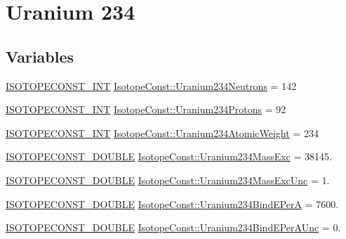\hypertarget{group___isotope_const-_uranium-_u234}{}\section{Uranium 234}
\label{group___isotope_const-_uranium-_u234}
\subsection*{Variables}
\begin{DoxyCompactItemize}
\item 
\mbox{\hyperlink{group___isotope_const-_macros_ga5f18360b3e99483a35c32d789e62621c}{I\+S\+O\+T\+O\+P\+E\+C\+O\+N\+S\+T\+\_\+\+I\+NT}} \mbox{\hyperlink{group___isotope_const-_uranium-_u234_gae9ac5126c38318056cb9f3781b5bd636}{Isotope\+Const\+::\+Uranium234\+Neutrons}} = 142
\item 
\mbox{\hyperlink{group___isotope_const-_macros_ga5f18360b3e99483a35c32d789e62621c}{I\+S\+O\+T\+O\+P\+E\+C\+O\+N\+S\+T\+\_\+\+I\+NT}} \mbox{\hyperlink{group___isotope_const-_uranium-_u234_gae6423ec7f68b44fc9706e3285d26dbec}{Isotope\+Const\+::\+Uranium234\+Protons}} = 92
\item 
\mbox{\hyperlink{group___isotope_const-_macros_ga5f18360b3e99483a35c32d789e62621c}{I\+S\+O\+T\+O\+P\+E\+C\+O\+N\+S\+T\+\_\+\+I\+NT}} \mbox{\hyperlink{group___isotope_const-_uranium-_u234_ga6e2110346dd9b0773ad788f5bb6b56c0}{Isotope\+Const\+::\+Uranium234\+Atomic\+Weight}} = 234
\item 
\mbox{\hyperlink{group___isotope_const-_macros_ga8f45a7272ce02c0b4c65c44636ed719a}{I\+S\+O\+T\+O\+P\+E\+C\+O\+N\+S\+T\+\_\+\+D\+O\+U\+B\+LE}} \mbox{\hyperlink{group___isotope_const-_uranium-_u234_ga84a741edddafaa8b29c165cd7967248f}{Isotope\+Const\+::\+Uranium234\+Mass\+Exc}} = 38145.
\item 
\mbox{\hyperlink{group___isotope_const-_macros_ga8f45a7272ce02c0b4c65c44636ed719a}{I\+S\+O\+T\+O\+P\+E\+C\+O\+N\+S\+T\+\_\+\+D\+O\+U\+B\+LE}} \mbox{\hyperlink{group___isotope_const-_uranium-_u234_ga7db5cf61a68b270ecac0d259ff03030a}{Isotope\+Const\+::\+Uranium234\+Mass\+Exc\+Unc}} = 1.
\item 
\mbox{\hyperlink{group___isotope_const-_macros_ga8f45a7272ce02c0b4c65c44636ed719a}{I\+S\+O\+T\+O\+P\+E\+C\+O\+N\+S\+T\+\_\+\+D\+O\+U\+B\+LE}} \mbox{\hyperlink{group___isotope_const-_uranium-_u234_ga26cfee388e4ee2aff4f634d93cd0fa61}{Isotope\+Const\+::\+Uranium234\+Bind\+E\+PerA}} = 7600.
\item 
\mbox{\hyperlink{group___isotope_const-_macros_ga8f45a7272ce02c0b4c65c44636ed719a}{I\+S\+O\+T\+O\+P\+E\+C\+O\+N\+S\+T\+\_\+\+D\+O\+U\+B\+LE}} \mbox{\hyperlink{group___isotope_const-_uranium-_u234_ga97ca22135580a34a6e01a6dad0e0bb69}{Isotope\+Const\+::\+Uranium234\+Bind\+E\+Per\+A\+Unc}} = 0.

\end{DoxyCompactItemize}
